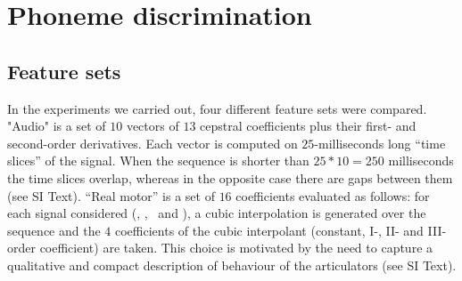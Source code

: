 \section{Phoneme discrimination}
\label{sec:class}

\subsection{Feature sets}
\label{subsec:featset}

In the experiments we carried out, four different feature sets were compared. 
"Audio" is a set of $10$ vectors of $13$ cepstral coefficients plus their first- 
and second-order derivatives. Each vector is computed on $25$-milliseconds long 
``time slices'' of the signal. When the sequence is shorter than $25*10=250$ milliseconds
 the time slices overlap, whereas in the opposite case there are gaps between them (see SI Text).
``Real motor'' is a set of $16$ coefficients evaluated as follows: for each
signal considered (\vlio, \alio, \vttu\ and \attu), a cubic interpolation is generated over 
the sequence and the $4$ coefficients of the cubic interpolant (constant, I-, II- and III-order 
coefficient) are taken. This choice is motivated by the need to capture a qualitative and compact
description of behaviour of the articulators (see SI Text).
